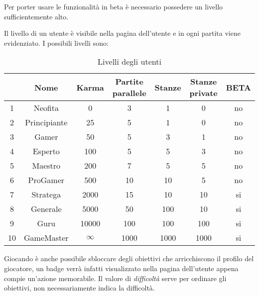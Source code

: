 Per porter usare le funzionalità in beta è necessario possedere un livello sufficientemente alto.

Il livello di un utente è visibile nella pagina dell'utente e in ogni partita viene evidenziato. I possibili livelli sono:

\begin{table}
	\begin{tabular}{|c|c|c|c|c|c|c|}
		\hline
		& \textbf{Nome} & \textbf{Karma} & \textbf{Partite parallele} & \textbf{Stanze} & \textbf{Stanze private} & \textbf{BETA} \\
		\hline
		1 & Neofita 	 & 0    &   3 &   1 &   0 & no \\
		2 & Principiante & 25   &   5 &   1 &   0 & no \\
		3 & Gamer        & 50   &   5 &   3 &   1 & no \\
		4 & Esperto      & 100  &   5 &   5 &   3 & no \\
		5 & Maestro      & 200  &   7 &   5 &   5 & no \\
		6 & ProGamer     & 500  &  10 &  10 &   5 & no \\
		7 & Stratega     & 2000 &  15 &  10 &  10 & si \\
		8 & Generale     & 5000 &  50 & 100 &  10 & si \\
		9 & Guru         & 10000& 100 & 100 & 100 & si \\
		10 & GameMaster   & $\infty$ & 1000 & 1000 & 1000 & si \\
		\hline
	\end{tabular}
	\caption{Livelli degli utenti}
	\label{tab:livelli}
\end{table}

Giocando è anche possibile sbloccare degli obiettivi che arricchiscono il profilo del giocatore, un badge verrà infatti visualizzato nella pagina dell'utente appena compie un'azione memorabile. Il valore di \emph{difficoltà} serve per ordinare gli obiettivi, non necessariamente indica la difficoltà.

